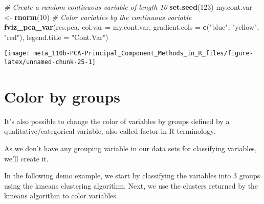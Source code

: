 \documentclass[]{book}
\newenvironment{Shaded}{\begin{snugshade}}{\end{snugshade}}
\newcommand{\CommentTok}[1]{\textcolor[rgb]{0.56,0.35,0.01}{\textit{#1}}}
\newcommand{\DataTypeTok}[1]{\textcolor[rgb]{0.13,0.29,0.53}{#1}}
\newcommand{\DecValTok}[1]{\textcolor[rgb]{0.00,0.00,0.81}{#1}}
\newcommand{\KeywordTok}[1]{\textcolor[rgb]{0.13,0.29,0.53}{\textbf{#1}}}
\newcommand{\NormalTok}[1]{#1}
\newcommand{\OperatorTok}[1]{\textcolor[rgb]{0.81,0.36,0.00}{\textbf{#1}}}
\newcommand{\StringTok}[1]{\textcolor[rgb]{0.31,0.60,0.02}{#1}}
\begin{document}
\begin{Shaded}
\begin{Highlighting}[]
\CommentTok{# Create a random continuous variable of length 10}
\KeywordTok{set.seed}\NormalTok{(}\DecValTok{123}\NormalTok{)}
\NormalTok{my.cont.var <-}\StringTok{ }\KeywordTok{rnorm}\NormalTok{(}\DecValTok{10}\NormalTok{)}
\CommentTok{# Color variables by the continuous variable}
\KeywordTok{fviz_pca_var}\NormalTok{(res.pca, }\DataTypeTok{col.var =}\NormalTok{ my.cont.var,}
             \DataTypeTok{gradient.cols =} \KeywordTok{c}\NormalTok{(}\StringTok{"blue"}\NormalTok{, }\StringTok{"yellow"}\NormalTok{, }\StringTok{"red"}\NormalTok{),}
             \DataTypeTok{legend.title =} \StringTok{"Cont.Var"}\NormalTok{)}
\end{Highlighting}
\end{Shaded}

\begin{center}\texttt{[image: meta\_110b-PCA-Principal\_Component\_Methods\_in\_R\_files/figure-latex/unnamed-chunk-25-1]} \end{center}

\hypertarget{color-by-groups}{%
\section{Color by groups}\label{color-by-groups}}

It's also possible to change the color of variables by groups defined by a qualitative/categorical variable, also called factor in R terminology.

As we don't have any grouping variable in our data sets for classifying variables, we'll create it.

In the following demo example, we start by classifying the variables into 3 groups using the kmeans clustering algorithm. Next, we use the clusters returned by the kmeans algorithm to color variables.

\begin{Shaded}
\end{Shaded}
\end{document}
